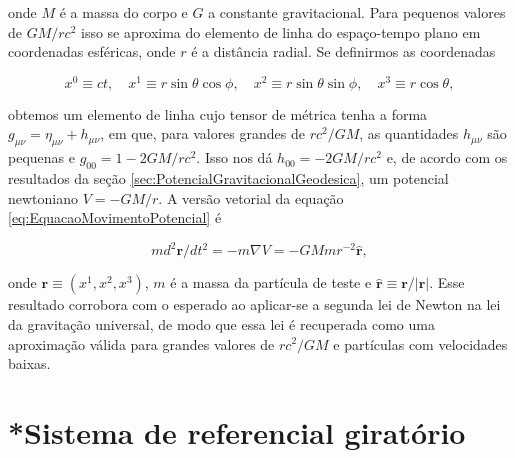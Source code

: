 onde $ M $ é a massa do corpo e $ G $ a constante gravitacional. Para pequenos valores de $ GM/rc^2 $ isso se aproxima do elemento de linha do espaço-tempo plano em coordenadas esféricas, onde $ r $ é a distância radial. Se definirmos as coordenadas

\[x^{0} \equiv c t, \quad x^{1} \equiv r \sin \theta \cos \phi, \quad x^{2} \equiv r \sin \theta \sin \phi, \quad x^{3} \equiv r \cos \theta,\]

obtemos um elemento de linha cujo tensor de métrica tenha a forma $ g_{\mu\nu} =\eta_{\mu \nu}+h_{\mu\nu} $, em que, para valores grandes de $ rc^2/GM $, as quantidades $ h_{\mu\nu} $ são pequenas e $ g_{00}=1-2GM/rc^2 $.  Isso nos dá $ h_{00} = -2GM/rc^2 $ e, de acordo com os resultados da seção \ref{sec:PotencialGravitacionalGeodesica}, um potencial newtoniano $ V = -GM/r $. A versão vetorial da equação \eqref{eq:EquacaoMovimentoPotencial} é 

\[
m d^{2} \mathbf{r} / d t^{2}=-m \nabla V=-G M m r^{-2} \hat{\mathbf{r}}
,\]

onde $ \mathbf{r} \equiv\left(x^{1}, x^{2}, x^{3}\right) $, $ m $ é a massa da partícula de teste e $ \hat{\mathbf{r}}\equiv \mathbf{r}/|\mathbf{r}| $. Esse resultado corrobora com o esperado ao aplicar-se a segunda lei de Newton na lei da gravitação universal, de modo que essa lei é recuperada como uma aproximação válida para grandes valores de $ rc^2/GM $ e partículas com velocidades baixas.



\section{*Sistema de referencial giratório}\label{sec:SistemaReferencialGiratorio}
